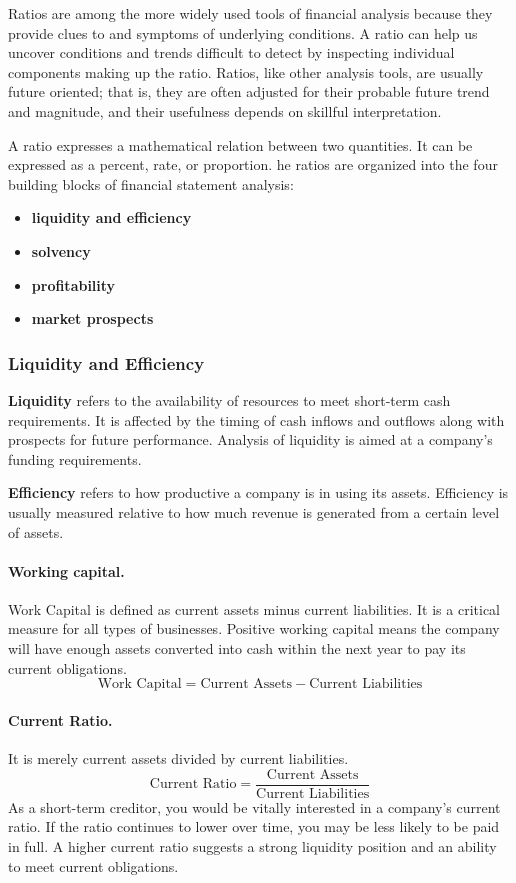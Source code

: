 \documentclass[../main.tex]{subfiles}
\begin{document}
	Ratios are among the more widely used tools of financial analysis because 
	they provide clues to and symptoms of underlying conditions. A ratio can 
	help us uncover conditions and trends difficult to detect by inspecting 
	individual components making up the ratio. Ratios, like other analysis 
	tools, are usually future oriented; that is, they are often adjusted for 
	their probable future trend and magnitude, and their usefulness depends on 
	skillful interpretation.
	
	A ratio expresses a mathematical relation between two quantities. It can be 
	expressed as a percent, rate, or proportion. he ratios are organized into 
	the four building blocks of financial statement analysis:
	\begin{itemize}[noitemsep]
		\item \textbf{liquidity and efficiency}
		\item \textbf{solvency}
		\item \textbf{profitability}
		\item \textbf{market prospects}
	\end{itemize}
	
	\subsubsection{Liquidity and Efficiency}
	
	\textbf{Liquidity} refers to the availability of resources to meet 
	short-term cash 
	requirements. It is affected by the timing of cash inflows and outflows 
	along with prospects for future performance. Analysis of liquidity is aimed 
	at a company’s funding requirements. 
	
	\textbf{Efficiency} refers to how productive a 
	company is in using its assets. Efficiency is usually measured relative to 
	how much revenue is generated from a certain level of assets.
	
	\paragraph{Working capital.} Work Capital is defined as current assets 
	minus current liabilities.  It 
	is a critical measure for all types of businesses.  Positive working 
	capital means the company will have enough assets converted into cash 
	within the next year to pay its current obligations. 
	\[
	\text{Work Capital} = \text{Current Assets} - \text{Current Liabilities}
	\]
	
	\paragraph{Current Ratio.} It is merely current assets divided by current 
	liabilities.
	\[
	\text{Current Ratio} = \frac{\text{Current Assets}}{\text{Current 
	Liabilities}}
	\]
	As a short-term creditor, you would be vitally interested in a company’s 
	current ratio. If the ratio continues to lower over time, you may be less 
	likely to be paid in full. A higher current ratio suggests a strong 
	liquidity position and an ability to meet current obligations.
	
\end{document}
